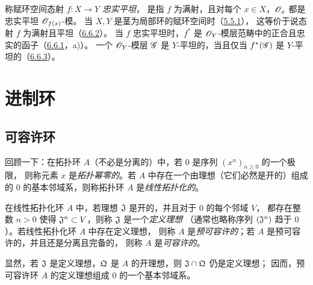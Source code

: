 称赋环空间态射 $f\colon X\to Y$ \emph{忠实平坦}，
是指 $f$ 为满射，且对每个 $x\in X$，$\mathscr O_x$ 都是忠实平坦 $\mathscr O_{f(x)}$-模。
当 $X,Y$ 是茎为局部环的赋环空间时（\hyperlink{para:0:5.5.1}{5.5.1}），
这等价于说态射 $f$ 为满射且平坦（\hyperlink{para:0:6.6.2}{6.6.2}）。
当 $f$ 忠实平坦时，$f^*$ 是 $\mathscr O_Y$-模层范畴中的正合且忠实的函子（\hyperlink{para:0:6.6.1}{6.6.1}，a)）。
一个 $\mathscr O_Y$-模层 $\mathscr G$ 是 $Y$-平坦的，当且仅当 $f^*(\mathscr G)$ 是 $Y$-平坦的（\hyperlink{para:0:6.6.3}{6.6.3}）。



\par

\section{进制环}\hypertarget{heading:0:7}{}
\subsection{可容许环}\hypertarget{heading:0:7.1}{}

回顾一下：在拓扑环 $A$（不必是分离的）中，若 $0$ 是序列 $(x^n)_{n\geq 0}$ 的一个极限，
则称元素 $x$ 是\emph{拓扑幂零的}。若 $A$ 中存在一个由理想（它们必然是开的）组成的
$0$ 的基本邻域系，则称拓扑环 $A$ 是\emph{线性拓扑化的}。

在线性拓扑化环 $A$ 中，若理想 $\mathfrak J$ 是开的，并且对于 $0$ 的每个邻域 $V$，
都存在整数 $n>0$ 使得 $\mathfrak J^n\subset V$，则称 $\mathfrak J$ 是一个\emph{定义理想}
（通常也略称序列 $(\mathfrak J^n)$ 趋于 $0$）。若线性拓扑化环 $A$ 中存在定义理想，
则称 $A$ 是\emph{预可容许的}；若 $A$ 是预可容许的，并且还是分离且完备的，
则称 $A$ 是\emph{可容许的}。

显然，若 $\mathfrak J$ 是定义理想，$\mathfrak Q$ 是 $A$ 的开理想，则 $\mathfrak J\cap\mathfrak Q$ 仍是定义理想；
因而，预可容许环 $A$ 的定义理想组成 $0$ 的一个基本邻域系。

